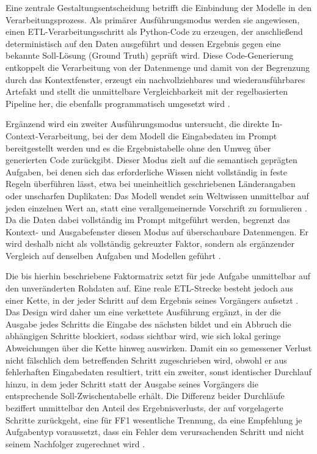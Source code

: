 Eine zentrale Gestaltungsentscheidung betrifft die Einbindung der Modelle in den Verarbeitungsprozess. Als primärer Ausführungsmodus werden sie angewiesen, einen \ac{ETL}-Verarbeitungsschritt als Python-Code zu erzeugen, der anschließend deterministisch auf den Daten ausgeführt und dessen Ergebnis gegen eine bekannte Soll-Lösung (Ground Truth) geprüft wird. Diese Code-Generierung entkoppelt die Verarbeitung von der Datenmenge und damit von der Begrenzung durch das Kontextfenster, erzeugt ein nachvollziehbares und wiederausführbares Artefakt und stellt die unmittelbare Vergleichbarkeit mit der regelbasierten Pipeline her, die ebenfalls programmatisch umgesetzt wird \autocite{khanOverviewETLTechniques2024,nagabhyruBridgingTraditionalETL2022}.

Ergänzend wird ein zweiter Ausführungsmodus untersucht, die direkte In-Context-Verarbeitung, bei der dem Modell die Eingabedaten im Prompt bereitgestellt werden und es die Ergebnistabelle ohne den Umweg über generierten Code zurückgibt. Dieser Modus zielt auf die semantisch geprägten Aufgaben, bei denen sich das erforderliche Wissen nicht vollständig in feste Regeln überführen lässt, etwa bei uneinheitlich geschriebenen Länderangaben oder unscharfen Duplikaten: Das Modell wendet sein Weltwissen unmittelbar auf jeden einzelnen Wert an, statt eine verallgemeinernde Vorschrift zu formulieren \autocite{hassaniRoleChatGPTData2023,khanCognitiveETLUsing2025}. Da die Daten dabei vollständig im Prompt mitgeführt werden, begrenzt das Kontext- und Ausgabefenster diesen Modus auf überschaubare Datenmengen. Er wird deshalb nicht als vollständig gekreuzter Faktor, sondern als ergänzender Vergleich auf denselben Aufgaben und Modellen geführt \autocite{zhaoSurveyLargeLanguage2026,changEfficientPromptingMethods2024}.

Die bis hierhin beschriebene Faktormatrix setzt für jede Aufgabe unmittelbar auf den unveränderten Rohdaten auf. Eine reale \ac{ETL}-Strecke besteht jedoch aus einer Kette, in der jeder Schritt auf dem Ergebnis seines Vorgängers aufsetzt \autocite{khanOverviewETLTechniques2024,walhaDataIntegrationTraditional2024}. Das Design wird daher um eine verkettete Ausführung ergänzt, in der die Ausgabe jedes Schritts die Eingabe des nächsten bildet und ein Abbruch die abhängigen Schritte blockiert, sodass sichtbar wird, wie sich lokal geringe Abweichungen über die Kette hinweg auswirken. Damit ein so gemessener Verlust nicht fälschlich dem betreffenden Schritt zugeschrieben wird, obwohl er aus fehlerhaften Eingabedaten resultiert, tritt ein zweiter, sonst identischer Durchlauf hinzu, in dem jeder Schritt statt der Ausgabe seines Vorgängers die entsprechende Soll-Zwischentabelle erhält. Die Differenz beider Durchläufe beziffert unmittelbar den Anteil des Ergebnisverlusts, der auf vorgelagerte Schritte zurückgeht, eine für FF1 wesentliche Trennung, da eine Empfehlung je Aufgabentyp voraussetzt, dass ein Fehler dem verursachenden Schritt und nicht seinem Nachfolger zugerechnet wird \autocite{nagabhyruBridgingTraditionalETL2022}.

